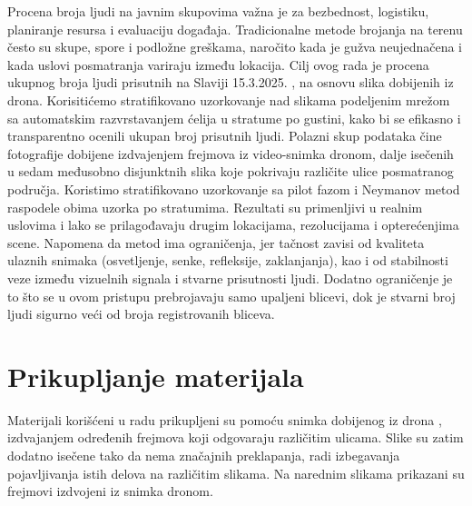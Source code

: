 \documentclass[a4paper,12pt]{article}
\begin{document}
Procena broja ljudi na javnim skupovima važna je za bezbednost, logistiku, planiranje resursa i evaluaciju događaja. Tradicionalne metode brojanja na terenu često su skupe, spore i podložne greškama, naročito kada je gužva neujednačena i kada uslovi posmatranja variraju između lokacija.
Cilj ovog rada je procena ukupnog broja ljudi prisutnih na Slaviji 15.3.2025. , na osnovu slika dobijenih iz drona. 
\newline
\newline
\noindent Korisitićemo stratifikovano uzorkovanje nad slikama podeljenim mrežom sa automatskim razvrstavanjem ćelija u stratume po gustini, kako bi se efikasno i transparentno ocenili ukupan broj prisutnih ljudi.
Polazni skup podataka čine fotografije dobijene izdvajenjem frejmova iz video-snimka dronom, dalje isečenih u sedam međusobno disjunktnih slika koje pokrivaju različite ulice posmatranog područja.
Koristimo stratifikovano uzorkovanje sa pilot fazom i Neymanov metod raspodele obima uzorka po stratumima.
\newline
\newline
\noindent Rezultati su primenljivi u realnim uslovima i lako se prilagođavaju drugim lokacijama, rezolucijama i opterećenjima scene.
\newline
\newline
\noindent Napomena da metod ima ograničenja, jer tačnost zavisi od kvaliteta ulaznih snimaka (osvetljenje, senke, refleksije, zaklanjanja), kao i od stabilnosti veze između vizuelnih signala i stvarne prisutnosti ljudi. Dodatno ograničenje je to što se u ovom pristupu prebrojavaju samo upaljeni blicevi, dok je stvarni broj ljudi sigurno veći od broja registrovanih bliceva.




\newpage
\section{Prikupljanje materijala}

Materijali korišćeni u radu prikupljeni su pomoću snimka dobijenog iz drona \cite{drone_video}, izdvajanjem određenih frejmova koji odgovaraju različitim ulicama. Slike su zatim dodatno isečene tako da nema značajnih preklapanja, radi izbegavanja pojavljivanja istih delova na različitim slikama.
Na narednim slikama prikazani su frejmovi izdvojeni iz snimka dronom.
\end{document}
